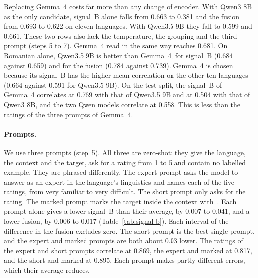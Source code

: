 Replacing Gemma~4 costs far more than any change of encoder. With Qwen3 8B as the only candidate,
signal~B alone falls from 0.663 to 0.381 and the fusion from 0.693 to 0.622 on eleven languages. %
With Qwen3.5 9B they fall to 0.599 and 0.661. These two rows also lack the temperature, the grouping and the third %
prompt (steps 5 to 7). Gemma~4 read in the same way reaches 0.681. On Romanian alone, %
Qwen3.5 9B is better than Gemma~4, for signal~B (0.684 against 0.659) and for the fusion (0.784 %
against 0.739). Gemma~4 is chosen because its signal~B has the higher mean correlation on the %
other ten languages (0.664 against 0.591 for Qwen3.5 9B). %
On the test split, the signal~B of Gemma~4 correlates at 0.769 with that of Qwen3.5 9B and at %
0.504 with that of Qwen3 8B, and the two Qwen models correlate at 0.558. This is less than the
ratings of the three prompts of Gemma~4.

\paragraph{Prompts.} We use three prompts (step~5). All three are zero-shot: they give the %
language, the context and the target, ask for a rating from 1 to 5 and contain no labelled
example. They are phrased differently. The expert prompt asks the model to answer as an expert in
the language's linguistics and names each of the five ratings, from very familiar to very
difficult. The short prompt only asks for the rating. The marked prompt marks the target inside the
context with \guillemotleft\,\guillemotright. Each prompt alone gives a lower signal~B than their
average, by 0.007 to 0.041, and a lower fusion, by 0.006 to 0.017 (Table~\ref{tab:signal-b}). Each %
interval of the difference in the fusion excludes zero. The short prompt is the best single prompt, %
and the expert and marked prompts are both about 0.03 lower. The ratings of the expert and short %
prompts correlate at 0.869, the expert and marked at 0.817, and the short and marked at 0.895. %
Each prompt makes partly different errors, which their average reduces.

